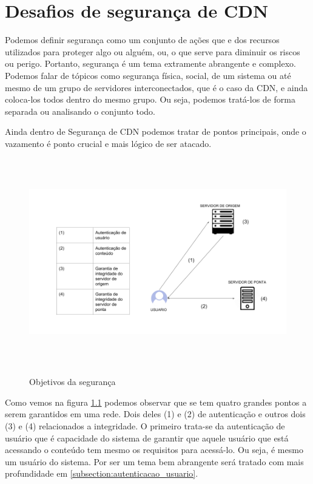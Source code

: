 \chapter{Desafios de segurança de CDN}
\label{sec:seguranca}
 Podemos definir seguran\c{c}a como um conjunto de a\c{c}\~oes que e dos recursos utilizados para proteger algo ou algu\'em, ou, o que serve para diminuir os riscos ou perigo. Portanto, seguran\c{c}a \'e um tema extramente abrangente e complexo. Podemos falar de t\'opicos como seguran\c{c}a f\'isica, social, de um sistema ou at\'e mesmo de um grupo de servidores interconectados, que \'e o caso da CDN, e ainda coloca-los todos dentro do mesmo grupo. Ou seja, podemos trat\'a-los de forma separada ou analisando o conjunto todo.
 
Ainda dentro de Seguran\c{c}a de CDN podemos tratar de pontos principais, onde o vazamento \'e ponto crucial e mais l\'ogico de ser atacado. 
\begin{figure}[H]
\caption{Objetivos da seguran\c{c}a}
\includegraphics[height=9cm]{Figuras/seguranca_intro.png} 
\label{figura:seguranca_intro}
\end{figure}

Como vemos na figura \ref{figura:seguranca_intro} podemos observar que se tem quatro grandes pontos a serem garantidos em uma rede. Dois deles (1) e (2) de autentica\c{c}\~ao e outros dois (3) e (4) relacionados a integridade. O primeiro trata-se da autentica\c{c}\~ao de usu\'ario que \'e capacidade do sistema de garantir que aquele usu\'ario que est\'a acessando o conte\'udo tem mesmo os requisitos para acess\'a-lo. Ou seja, \'e mesmo um usu\'ario do sistema. Por ser um tema bem abrangente ser\'a tratado com mais profundidade em \ref{subsection:autenticacao_usuario}.

